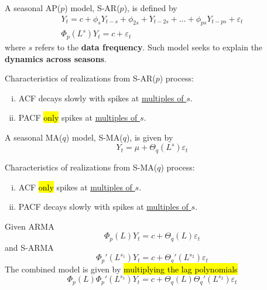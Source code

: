 \documentclass[11pt]{article}
\begin{document}
				\begin{definition}
					A seasonal AP($p$) model, S-AR($p$), is defined by
					\begin{gather}
						Y_t = c + \phi_s Y_{t-s} + \phi_{2s} + Y_{t-2s} + \dots + \phi_{ps} Y_{t - ps} + \varepsilon_t \\
						\Phi_{p}(L^s) Y_t = c + \varepsilon_t
					\end{gather}
					where $s$ refers to the \textbf{data frequency}. Such model seeks to explain the \textbf{dynamics across seasons}.
				\end{definition}
				
				\begin{definition}
					Characteristics of realizations from S-AR($p$) process:
					\begin{enumerate}[(i)]
						\item ACF decays slowly with spikes at \ul{multiples of $s$}.
						\item PACF \hl{only} spikes at \ul{multiples of $s$}.
					\end{enumerate}
				\end{definition}
				
				\begin{definition}
					A seasonal MA($q$) model, S-MA($q$), is given by
					\begin{equation}
						Y_t = \mu + \Theta_q(L^s) \varepsilon_t
					\end{equation}
				\end{definition}
				
				\begin{remark}
					Characteristics of realizations from S-MA($q$) process:
					\begin{enumerate}[(i)]
						\item ACF \hl{only} spikes at \ul{multiples of $s$}.
						\item PACF decays slowly with spikes at \ul{multiples of $s$}.
					\end{enumerate}
				\end{remark}
				
				\begin{proposition}
					Given ARMA 
					\begin{equation}
						\Phi_p(L) Y_t = c + \Theta_q(L) \varepsilon_t
					\end{equation}
					and S-ARMA
					\begin{equation}
						\Phi_p'(L^{s_1}) Y_t = c + \Theta_q'(L^{s_2}) \varepsilon_t
					\end{equation}
					The combined model is given by \hl{multiplying the lag polynomials}
					\begin{equation}
						\Phi_p(L) \Phi_p'(L^{s_1}) Y_t = c +  \Theta_q(L) \Theta_q'(L^{s_2}) \varepsilon_t
					\end{equation}
				\end{proposition}
\end{document}
